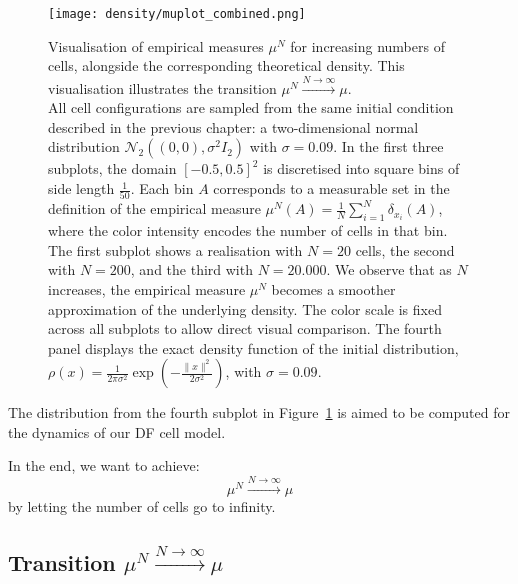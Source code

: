 \begin{figure}
	\begin{center}
		\texttt{[image: density/muplot\_combined.png]}
		\caption{
            Visualisation of empirical measures $\mu^N$ for increasing numbers of cells, alongside the corresponding theoretical density. 
            This visualisation illustrates the transition \( \mu^N \xrightarrow{N \to \infty} \mu\). \\
            All cell configurations are sampled from the same initial condition described in the previous chapter: a two-dimensional normal distribution \( \mathcal{N}_2((0,0), \sigma^2 I_2) \) with \( \sigma = 0.09 \). 
            In the first three subplots, the domain \([-0.5, 0.5]^2\) is discretised into square bins of side length \(\frac{1}{50}\). 
            Each bin \( A \) corresponds to a measurable set in the definition of the empirical measure \( \mu^N(A) = \frac{1}{N} \sum_{i=1}^N \delta_{x_i}(A) \), where the color intensity encodes the number of cells in that bin. \\
            The first subplot shows a realisation with \( N = 20 \) cells, the second with \( N = 200 \), and the third with \( N = 20{.}000 \). 
            We observe that as \( N \) increases, the empirical measure \( \mu^N \) becomes a smoother approximation of the underlying density. 
            The color scale is fixed across all subplots to allow direct visual comparison.
            The fourth panel displays the exact density function of the initial distribution, \( \rho(x) = \frac{1}{2\pi\sigma^2} \exp\left( -\frac{\|x\|^2}{2\sigma^2} \right) \), with \( \sigma = 0.09 \). 
         }
		\label{fig:muTransition}
	\end{center}
\end{figure}

The distribution from the fourth subplot in Figure~\ref{fig:muTransition} is aimed to be computed for the dynamics of our DF cell model. 

In the end, we want to achieve:
\[ \mu^N \xrightarrow{N \to \infty} \mu\]
by letting the number of cells go to infinity. \\

\subsection{Transition $\mu^N \xrightarrow{N \to \infty} \mu$ }



